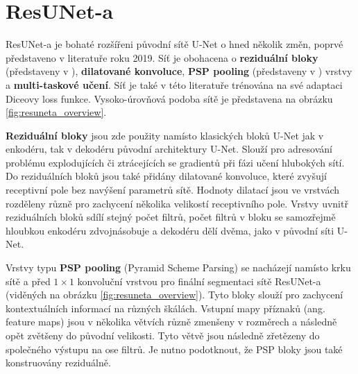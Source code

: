 \section{ResUNet-a}
\label{sec:Chapter25}

ResUNet-a je bohaté rozšířeni původní sítě U-Net o hned několik změn, poprvé představeno v literatuře \cite{resuneta} roku 2019. Síť je obohacena o \textbf{reziduální bloky} (představeny v \cite{residualblocks}), \textbf{dilatované konvoluce}, \textbf{PSP pooling} (představeny v \cite{psp}) vrstvy a \textbf{multi-taskové učení}. Síť je také v této literatuře trénována na své adaptaci Diceovy loss funkce. Vysoko-úrovňová podoba sítě je představena na obrázku \ref{fig:resuneta_overview}.

\textbf{Reziduální bloky} jsou zde použity namísto klasických bloků U-Net jak v enkodéru, tak v dekodéru původní architektury U-Net. Slouží pro adresování problému explodujících či ztrácejících se gradientů při fázi učení hlubokých sítí. Do reziduálních bloků jsou také přidány dilatované konvoluce, které zvyšují receptivní pole bez navýšení parametrů sítě. Hodnoty dilatací jsou ve vrstvách rozděleny různě pro zachycení několika velikostí receptivního pole. Vrstvy uvnitř reziduálních bloků sdílí stejný počet filtrů, počet filtrů v bloku se samozřejmě hloubkou enkodéru zdvojnásobuje a dekodéru dělí dvěma, jako v původní síti U-Net.

Vrstvy typu \textbf{PSP pooling} (Pyramid Scheme Parsing) se nacházejí namísto krku sítě a před $1\times1$ konvoluční vrstvou pro finální segmentaci sítě ResUNet-a (viděných na obrázku \ref{fig:resuneta_overview}). Tyto bloky slouží pro zachycení kontextuálních informací na různých škálách. Vstupní mapy příznaků (ang. feature maps) jsou v několika větvích různě zmenšeny v rozměrech a následně opět zvětšeny do původní velikosti. Tyto větvě jsou následně zřetězeny do společného výstupu na ose filtrů. Je nutno podotknout, že PSP bloky jsou také konstruovány reziduálně.

